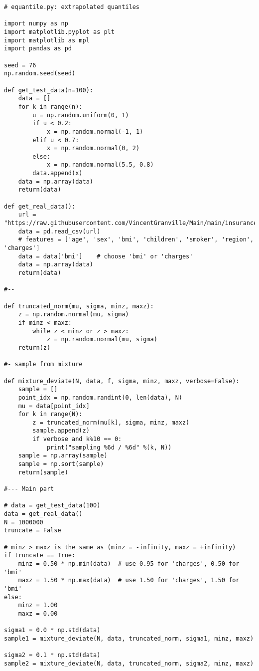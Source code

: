 \documentclass[oneside,10pt]{book}
\begin{document}
\begin{lstlisting}
# equantile.py: extrapolated quantiles

import numpy as np
import matplotlib.pyplot as plt
import matplotlib as mpl
import pandas as pd

seed = 76
np.random.seed(seed)

def get_test_data(n=100):
    data = []
    for k in range(n):
        u = np.random.uniform(0, 1)
        if u < 0.2:
            x = np.random.normal(-1, 1)
        elif u < 0.7:
            x = np.random.normal(0, 2)
        else: 
            x = np.random.normal(5.5, 0.8)
        data.append(x)
    data = np.array(data)
    return(data)

def get_real_data():
    url = "https://raw.githubusercontent.com/VincentGranville/Main/main/insurance.csv"
    data = pd.read_csv(url)
    # features = ['age', 'sex', 'bmi', 'children', 'smoker', 'region', 'charges'] 
    data = data['bmi']    # choose 'bmi' or 'charges'
    data = np.array(data)
    return(data)

#--

def truncated_norm(mu, sigma, minz, maxz):
    z = np.random.normal(mu, sigma)
    if minz < maxz:
        while z < minz or z > maxz:
            z = np.random.normal(mu, sigma)
    return(z)

#- sample from mixture

def mixture_deviate(N, data, f, sigma, minz, maxz, verbose=False):
    sample = []
    point_idx = np.random.randint(0, len(data), N) 
    mu = data[point_idx]
    for k in range(N):
        z = truncated_norm(mu[k], sigma, minz, maxz)
        sample.append(z)
        if verbose and k%10 == 0:
            print("sampling %6d / %6d" %(k, N))
    sample = np.array(sample)
    sample = np.sort(sample)
    return(sample)

#--- Main part

# data = get_test_data(100)
data = get_real_data()
N = 1000000
truncate = False

# minz > maxz is the same as (minz = -infinity, maxz = +infinity)
if truncate == True:
    minz = 0.50 * np.min(data)  # use 0.95 for 'charges', 0.50 for 'bmi'
    maxz = 1.50 * np.max(data)  # use 1.50 for 'charges', 1.50 for 'bmi'
else:
    minz = 1.00
    maxz = 0.00

sigma1 = 0.0 * np.std(data) 
sample1 = mixture_deviate(N, data, truncated_norm, sigma1, minz, maxz)

sigma2 = 0.1 * np.std(data) 
sample2 = mixture_deviate(N, data, truncated_norm, sigma2, minz, maxz)


\end{lstlisting}
\end{document}
